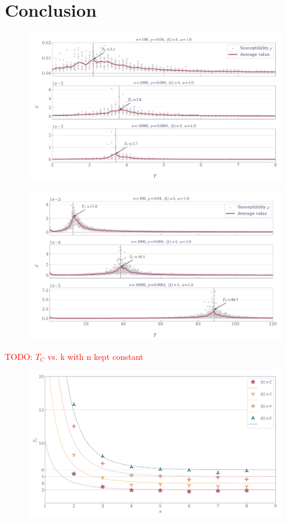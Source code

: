 \documentclass[11pt,a4paper]{article}
\newcommand{\todo}[1]{\textcolor{red}{TODO: #1}}
\begin{document}
\section{Conclusion}

\begin{figure}[ht!]
    \includegraphics[width=\linewidth]{../figures/suscept_ER_nearest.pdf}
\end{figure}


\begin{figure}[ht!]
    \includegraphics[width=\linewidth]{../figures/suscept_ER_single.pdf}
\end{figure}

\todo{$T_C$ vs. k with n kept constant}
\begin{figure}[ht!]
    \includegraphics[width=\linewidth]{../figures/TC_vs_alpha.pdf}
\end{figure}
\end{document}
